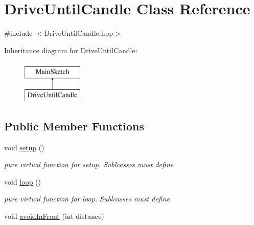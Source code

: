 \hypertarget{classDriveUntilCandle}{\section{Drive\-Until\-Candle Class Reference}
\label{classDriveUntilCandle}
}


{\ttfamily \#include $<$Drive\-Until\-Candle.\-hpp$>$}

Inheritance diagram for Drive\-Until\-Candle\-:\begin{figure}[H]
\begin{center}
\leavevmode
\includegraphics[height=2.000000cm]{classDriveUntilCandle}
\end{center}
\end{figure}
\subsection*{Public Member Functions}
\begin{DoxyCompactItemize}
\item 
void \hyperlink{classDriveUntilCandle_a520ee2277625ce84b594b0a073d23f84}{setup} ()
\begin{DoxyCompactList}\small\item\em pure virtual function for setup. Sublcasses must define \end{DoxyCompactList}\item 
void \hyperlink{classDriveUntilCandle_a6c5970d7250b2fd9658bb1a84d2a4ce7}{loop} ()
\begin{DoxyCompactList}\small\item\em pure virtual function for loop. Sublcasses must define \end{DoxyCompactList}\item 
void \hyperlink{classDriveUntilCandle_a0d72ef9e0ab6b731b36ecfce2b4fa6f2}{avoid\-In\-Front} (int distance)
\end{DoxyCompactItemize}
